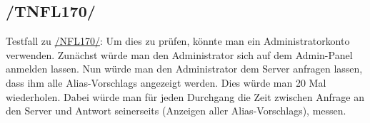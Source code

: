 \subsection*{/TNFL170/}
\label{/TNFL170/} Testfall zu \hyperref[/NFL170/]{/NFL170/}: Um dies zu prüfen, könnte man ein \Gls{Administrator}konto verwenden. Zunächst würde man den \Gls{Administrator} sich auf dem \Gls{Admin-Panel} anmelden lassen. Nun würde man den \Gls{Administrator} dem \Gls{Server} anfragen lassen, dass ihm alle \Glspl{Alias-Vorschlag} angezeigt werden. Dies würde man 20 Mal wiederholen. Dabei würde man für jeden Durchgang die Zeit zwischen Anfrage an den \Gls{Server} und Antwort seinerseits (Anzeigen aller \Glspl{Alias-Vorschlag}), messen.